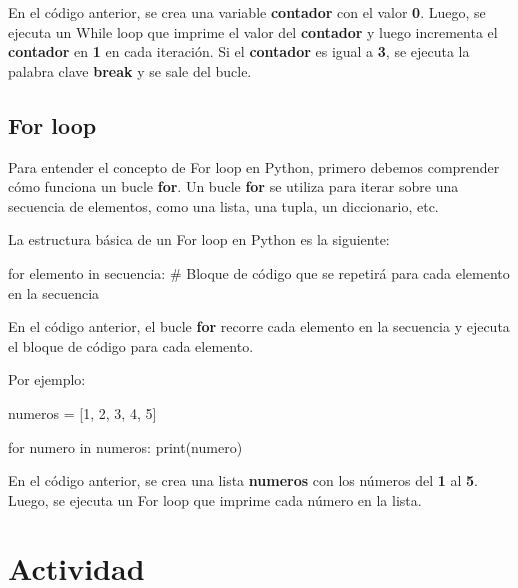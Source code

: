 \documentclass[
  a4paper,
  DIV=11,
  numbers=noendperiod,
  onepage,
  openany]{scrreprt}
\newenvironment{Shaded}{\begin{snugshade}}{\end{snugshade}}
\newcommand{\BuiltInTok}[1]{\textcolor[rgb]{0.00,0.23,0.31}{#1}}
\newcommand{\CommentTok}[1]{\textcolor[rgb]{0.37,0.37,0.37}{#1}}
\newcommand{\ControlFlowTok}[1]{\textcolor[rgb]{0.00,0.23,0.31}{#1}}
\newcommand{\DecValTok}[1]{\textcolor[rgb]{0.68,0.00,0.00}{#1}}
\newcommand{\KeywordTok}[1]{\textcolor[rgb]{0.00,0.23,0.31}{#1}}
\newcommand{\NormalTok}[1]{\textcolor[rgb]{0.00,0.23,0.31}{#1}}
\newcommand{\OperatorTok}[1]{\textcolor[rgb]{0.37,0.37,0.37}{#1}}
\begin{document}
En el código anterior, se crea una variable \textbf{contador} con el
valor \textbf{0}. Luego, se ejecuta un While loop que imprime el valor
del \textbf{contador} y luego incrementa el \textbf{contador} en
\textbf{1} en cada iteración. Si el \textbf{contador} es igual a
\textbf{3}, se ejecuta la palabra clave \textbf{break} y se sale del
bucle.

\section{For loop}\label{for-loop}

Para entender el concepto de For loop en Python, primero debemos
comprender cómo funciona un bucle \textbf{for}. Un bucle \textbf{for} se
utiliza para iterar sobre una secuencia de elementos, como una lista,
una tupla, un diccionario, etc.

La estructura básica de un For loop en Python es la siguiente:

\begin{Shaded}
\begin{Highlighting}[]
\ControlFlowTok{for}\NormalTok{ elemento }\KeywordTok{in}\NormalTok{ secuencia:}
    \CommentTok{\# Bloque de código que se repetirá para cada elemento en la secuencia}
\end{Highlighting}
\end{Shaded}

En el código anterior, el bucle \textbf{for} recorre cada elemento en la
secuencia y ejecuta el bloque de código para cada elemento.

Por ejemplo:

\begin{Shaded}
\begin{Highlighting}[]
\NormalTok{numeros }\OperatorTok{=}\NormalTok{ [}\DecValTok{1}\NormalTok{, }\DecValTok{2}\NormalTok{, }\DecValTok{3}\NormalTok{, }\DecValTok{4}\NormalTok{, }\DecValTok{5}\NormalTok{]}

\ControlFlowTok{for}\NormalTok{ numero }\KeywordTok{in}\NormalTok{ numeros:}
    \BuiltInTok{print}\NormalTok{(numero)}
\end{Highlighting}
\end{Shaded}

En el código anterior, se crea una lista \textbf{numeros} con los
números del \textbf{1} al \textbf{5}. Luego, se ejecuta un For loop que
imprime cada número en la lista.

\chapter{Actividad}\label{actividad-2}
\end{document}
